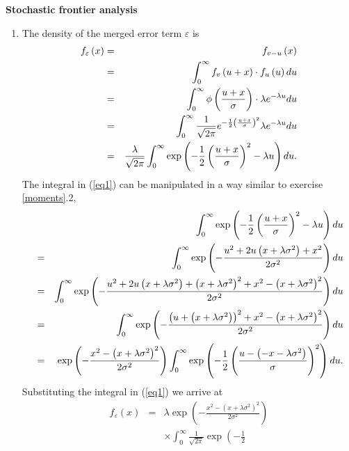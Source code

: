 \documentclass{article}
\begin{document}
\begin{solution}
\textbf{Stochastic frontier analysis}

\begin{enumerate}
\item The density of the merged error term $\varepsilon $ is%
\begin{eqnarray}
f_{\varepsilon }\left( x\right)  &=&f_{v-u}\left( x\right)   \notag \\
&=&\int_{0}^{\infty }f_{v}\left( u+x\right) \cdot f_{u}\left( u\right) du
\notag \\
&=&\int_{0}^{\infty }\phi \left( \frac{u+x}{\sigma }\right) \cdot \lambda
e^{-\lambda u}du  \notag \\
&=&\int_{0}^{\infty }\frac{1}{\sqrt{2\pi }}e^{-\frac{1}{2}\left( \frac{u+x}{%
\sigma }\right) ^{2}}\lambda e^{-\lambda u}du  \notag \\
&=&\frac{\lambda }{\sqrt{2\pi }}\int_{0}^{\infty }\exp \left( -\frac{1}{2}%
\left( \frac{u+x}{\sigma }\right) ^{2}-\lambda u\right) du.  \label{eq1}
\end{eqnarray}%
The integral in (\ref{eq1}) can be manipulated in a way similar to exercise %
\ref{moments}.2,%
\begin{eqnarray*}
&&\int_{0}^{\infty }\exp \left( -\frac{1}{2}\left( \frac{u+x}{\sigma }%
\right) ^{2}-\lambda u\right) du \\
&=&\int_{0}^{\infty }\exp \left( -\frac{u^{2}+2u\left( x+\lambda \sigma
^{2}\right) +x^{2}}{2\sigma ^{2}}\right) du \\
&=&\int_{0}^{\infty }\exp \left( -\frac{u^{2}+2u\left( x+\lambda \sigma
^{2}\right) +\left( x+\lambda \sigma ^{2}\right) ^{2}+x^{2}-\left( x+\lambda
\sigma ^{2}\right) ^{2}}{2\sigma ^{2}}\right) du \\
&=&\int_{0}^{\infty }\exp \left( -\frac{\left( u+\left( x+\lambda \sigma
^{2}\right) \right) ^{2}+x^{2}-\left( x+\lambda \sigma ^{2}\right) ^{2}}{%
2\sigma ^{2}}\right) du \\
&=&\exp \left( -\frac{x^{2}-\left( x+\lambda \sigma ^{2}\right) ^{2}}{%
2\sigma ^{2}}\right) \int_{0}^{\infty }\exp \left( -\frac{1}{2}\left( \frac{%
u-\left( -x-\lambda \sigma ^{2}\right) }{\sigma }\right) ^{2}\right) du.
\end{eqnarray*}%
Substituting the integral in (\ref{eq1}) we arrive at%
\begin{eqnarray*}
f_{\varepsilon }\left( x\right)  &=&\lambda \exp \left( -\frac{x^{2}-\left(
x+\lambda \sigma ^{2}\right) ^{2}}{2\sigma ^{2}}\right)  \\
&&\times \int_{0}^{\infty }\frac{1}{\sqrt{2\pi }}\exp \left( -\frac{1}{2}%

\end{eqnarray*}
\end{enumerate}
\end{solution}
\end{document}
